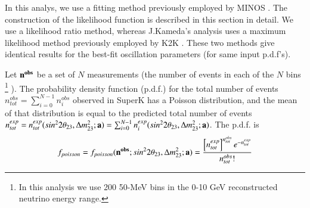 In this analys, we use a fitting method previously employed by MINOS \cite{MinosDisappearanceAnalysis}.
The construction of the likelihood function is described in this section in detail.
We use a likelihood ratio method, 
whereas J.Kameda's analysis uses a
maximum likelihood
method previously employed by K2K \cite{K2KDisappearanceAnalysis}.
These two methods give identical results for the best-fit oscillation parameters (for same input p.d.f's).

Let ${\bf n^{obs}}$ be a set of $N$ measurements (the number of events in each of the $N$ bins
\footnote
{
  In this analysis we use 200 50-MeV bins in the 0-10 GeV reconstructed neutrino energy range.
}
).
The probability density function (p.d.f.) for the total number of events 
$n^{obs}_{tot} = \sum_{i=0}^{N-1} n^{obs}_{i}$
observed in SuperK has a 
Poisson distribution, and the mean of that distribution is equal to the predicted total number 
of events $n^{exp}_{tot} = n^{exp}_{tot}(sin^{2}2\theta_{23},\Delta m^{2}_{23}; {\bf a})
= \sum_{i=0}^{N-1} n^{exp}_{i}(sin^{2}2\theta_{23},\Delta m^{2}_{23}; {\bf a})$. 
The p.d.f. is
\begin{equation}
\begin{array}{rcl}
\displaystyle
f_{poisson} = 
f_{poisson}({\bf n^{obs}}; sin^{2}2\theta_{23},\Delta m^{2}_{23}; {\bf a}) = 
   \frac{\left[n^{exp}_{tot}\right]^{n^{obs}_{tot}}
   e^{-n^{exp}_{tot}}}{n^{obs}_{tot}!} 
\end{array}
\label{eq:pdf_poisson}
\end{equation}

